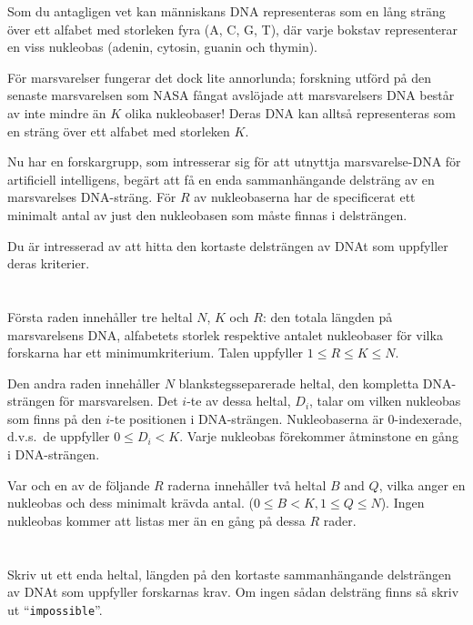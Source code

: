 \ifx\boi\undefined\fi
\def\version{jury-1}
Som du antagligen vet kan människans DNA representeras som en lång sträng över ett alfabet med storleken fyra ({A, C, G, T}), där varje bokstav representerar en viss nukleobas (adenin, cytosin, guanin och thymin).

För marsvarelser fungerar det dock lite annorlunda; forskning utförd på den senaste marsvarelsen som NASA fångat avslöjade att marsvarelsers DNA består av inte mindre än $K$ olika nukleobaser! Deras DNA kan alltså representeras som en sträng över ett alfabet med storleken $K$.

Nu har en forskargrupp, som intresserar sig för att utnyttja marsvarelse-DNA för artificiell intelligens, begärt att få en enda sammanhängande delsträng av en marsvarelses DNA-sträng. För $R$ av nukleobaserna har de specificerat 
ett minimalt antal av just den nukleobasen som måste finnas i delsträngen.

Du är intresserad av att hitta den kortaste delsträngen av DNAt som uppfyller deras kriterier.

\section*{}
Första raden innehåller tre heltal $N$, $K$ och $R$: den totala längden på marsvarelsens DNA, alfabetets storlek respektive antalet nukleobaser för vilka forskarna har ett minimumkriterium. Talen uppfyller $1 \le R \le K \le N$.

Den andra raden innehåller $N$ blankstegsseparerade heltal, den kompletta DNA-strängen för marsvarelsen. Det $i$-te av dessa heltal, $D_i$, talar om vilken nukleobas som finns på den $i$-te positionen i DNA-strängen. Nukleobaserna är $0$-indexerade, d.v.s.\ de uppfyller $0 \leq D_i < K$. Varje nukleobas förekommer åtminstone en gång i DNA-strängen.

Var och en av de följande $R$ raderna innehåller två heltal  $B$ and $Q$,  vilka anger en nukleobas och dess minimalt krävda antal.
($0 \le B < K, 1 \le Q \le N$).
Ingen nukleobas kommer att listas mer än en gång på dessa $R$ rader.

\section*{\outputsection}
Skriv ut ett enda heltal, längden på den kortaste sammanhängande delsträngen av DNAt som uppfyller forskarnas krav. Om ingen sådan delsträng finns så skriv ut  ``\texttt{impossible}''.

